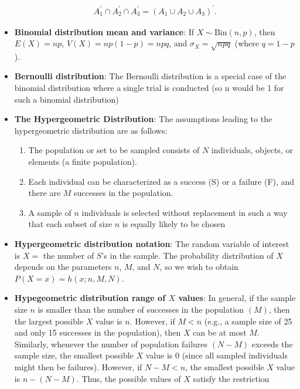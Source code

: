 \documentclass{report}
\begin{document}
\begin{itemize}
        \begin{align*}
            A_{1}^{\prime} \cap A_{2}^{\prime} \cap A_{3}^{\prime} = (A_{1} \cup A_{2} \cup A_{3})^{\prime}
        .\end{align*}
    \item \textbf{Binomial distribution mean and variance}:
        If \( X \sim \text{Bin}(n, p) \), then \( E(X) = np \), \( V(X) = np(1 - p) = npq \), and \( \sigma_X = \sqrt{npq} \) (where \( q = 1 - p \)).
    \item \textbf{Bernoulli distribution}:
        The Bernoulli distribution is a special case of the binomial distribution where a single trial is conducted (so n would be 1 for such a binomial distribution)
    \item \textbf{The Hypergeometric Distribution}:
        The assumptions leading to the hypergeometric distribution are as follows:
        \begin{enumerate}
            \item The population or set to be sampled consists of $N$ individuals, objects, or elements (a finite population).
            \item Each individual can be characterized as a success (S) or a failure (F), and there are $M$ successes in the population.
            \item A sample of $n$ individuals is selected without replacement in such a way that each subset of size $n$ is equally likely to be chosen
        \end{enumerate}
    \item \textbf{Hypergeometric distribution notation}:
        The random variable of interest is \( X = \) the number of \( S \)'s in the sample. The probability distribution of \( X \) depends on the parameters \( n \), \( M \), and \( N \), so we wish to obtain \( P(X = x) = h(x; n, M, N) \).
    \item \textbf{Hypegeometric distribution range of $X$ values}: In general, if the sample size $n$ is smaller than the number of successes in the population $(M)$, then the largest possible $X$ value is $n$. However, if $M < n$ (e.g., a sample size of 25 and only 15 successes in the population), then $X$ can be at most $M$. Similarly, whenever the number of population failures $(N - M)$ exceeds the sample size, the smallest possible $X$ value is 0 (since all sampled individuals might then be failures). However, if $N - M < n$, the smallest possible $X$ value is $n - (N - M)$. Thus, the possible values of $X$ satisfy the restriction 
        \begin{align*}

\end{align*}
\end{itemize}
\end{document}
